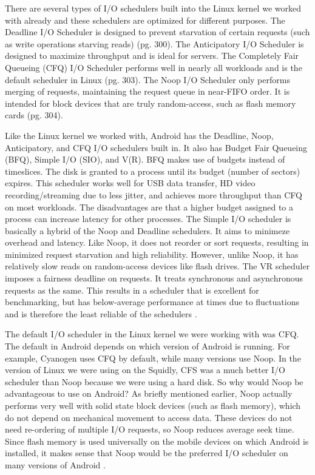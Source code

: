 \documentclass[letterpaper,10pt,titlepage]{article}
\newcommand{\tab}{\hspace*{2em}} %
\begin{document}
\tab There are several types of I/O schedulers built into the Linux kernel we worked with already and these schedulers are optimized for different purposes. The Deadline I/O Scheduler is designed to prevent starvation of certain requests (such as write operations starving reads) \cite{Love}(pg. 300). The Anticipatory I/O Scheduler is designed to maximize throughput and is ideal for servers. The Completely Fair Queueing (CFQ) I/O Scheduler performs well in nearly all workloads and is the default scheduler in Linux \cite{Love}(pg. 303). The Noop I/O Scheduler only performs merging of requests, maintaining the request queue in near-FIFO order. It is intended for block devices that are truly random-access, such as flash memory cards \cite{Love}(pg. 304).

\tab Like the Linux kernel we worked with, Android has the Deadline, Noop, Anticipatory, and CFQ I/O schedulers built in. It also has Budget Fair Queueing (BFQ), Simple I/O (SIO), and V(R). BFQ makes use of budgets instead of timeslices. The disk is granted to a process until its budget (number of sectors) expires. This scheduler works well for USB data transfer, HD video recording/streaming due to less jitter, and achieves more throughput than CFQ on most workloads. The disadvantages are that a higher budget assigned to a process can increase latency for other processes. The Simple I/O scheduler is basically a hybrid of the Noop and Deadline schedulers. It aims to minimeze overhead and latency. Like Noop, it does not reorder or sort requests, resulting in minimized request starvation and high reliability. However, unlike Noop, it has relatively slow reads on random-access devices like flash drives. The VR scheduler imposes a fairness deadline on requests. It treats synchronous and asynchronous requests as the same. This results in a scheduler that is excellent for benchmarking, but has below-average performance at times due to fluctuations and is therefore the least reliable of the schedulers \cite{zhanjia}.

\tab The default I/O scheduler in the Linux kernel we were working with was CFQ. The default in Android depends on which version of Android is running. For example, Cyanogen uses CFQ by default, while many versions use Noop. In the version of Linux we were using on the Squidly, CFS was a much better I/O scheduler than Noop because we were using a hard disk. So why would Noop be advantageous to use on Android? As briefly mentioned earlier, Noop actually performs very well with solid state block devices (such as flash memory), which do not depend on mechanical movement to access data. These devices do not need re-ordering of multiple I/O requests, so Noop reduces average seek time. Since flash memory is used universally on the mobile devices on which Android is installed, it makes sense that Noop would be the preferred I/O scheduler on many versions of Android \cite{farmatito}.
\end{document}
